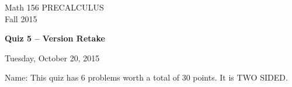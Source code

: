 \documentclass[11pt]{article}
\begin{document}
\begin{center}
\vspace{2in}

\huge{Math 156 PRECALCULUS \\
Fall 2015}

\vfill

\huge{\bf{Quiz 5 -- Version Retake}}\\

\vspace{0.5in}

\large{Tuesday, October 20, 2015}\\

\vfill


{\huge{Name:{\underline{\hspace{2in}}}}}
\vfill
This quiz has 6 problems worth a total of 30 points. It is TWO SIDED. 
\vfill
\end{center}
\newpage
\restoregeometry
\end{document}
